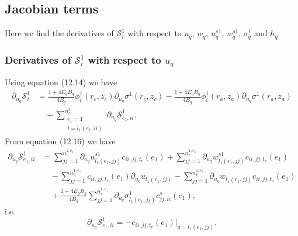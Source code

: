 \documentclass{article}
\begin{document}
\subsection{Jacobian terms} %
Here we find the derivatives of $\mathcal{S}_i^1$ with respect to $u_q$, $w_q$, $u_q^{s1}$, $w_q^{s1}$, $\sigma_q^1$ and $h_q$.

\subsubsection{Derivatives of $\mathcal{S}_i^1$ with respect to $u_q$} %
Using equation (12.14) we have
\begin{align}
\partial_{u_q} \mathcal{S}_i^1 &= \frac{1 + 4 E_g B_g}{4 B_g} \phi_i^1(r_c,z_c) \partial_{u_q} \sigma^1(r_c,z_c) - \frac{1 + 4 E_g B_g}{4 B_g} \phi_i^1(r_a,z_a) \partial_{u_q} \sigma^1(r_a,z_a) \nonumber\\
&\quad + \sum_{\substack{e_1=1\\ i=l_1(e_1,ii)}}^{n_{el}^1} \partial_{u_q} \mathcal{S}_{e_1,ii}^1. \tag{12.19}
\end{align}
From equation (12.16) we have
\begin{align}
\partial_{u_q} \mathcal{S}_{e_1,ii}^1 &= \sum_{jj=1}^{n_v^{1,e_1}} \partial_{u_q} u_{l_1(e_1,jj)}^{s1} c_{ii,jj,t_r}(e_1) + \sum_{jj=1}^{n_v^{1,e_1}} \partial_{u_q} w_{l_1(e_1,jj)}^{s1} c_{ii,jj,t_z}(e_1) \nonumber\\
&\quad - \sum_{jj=1}^{n_v^{1,e_1}} c_{ii,jj,t_r}(e_1) \partial_{u_q} u_{l_1(e_1,jj)} - \sum_{jj=1}^{n_v^{1,e_1}} \partial_{u_q} w_{l_1(e_1,jj)} c_{ii,jj,t_z}(e_1) \nonumber\\
&\quad + \frac{1 + 4 E_g B_g}{4 B_g} \sum_{jj=1}^{n_v^{1,e_1}} \partial_{u_q} \sigma_{l_1(e_1,jj)}^1 c_{jj,ii}^s(e_1), \tag{12.20}
\end{align}
i.e.
\begin{equation}
\partial_{u_q} \mathcal{S}_{e_1,ii}^1 = - c_{ii,jj,t_r}(e_1) \big|_{q=l_1(e_1,jj)}. \tag{12.21}
\end{equation}
\end{document}

